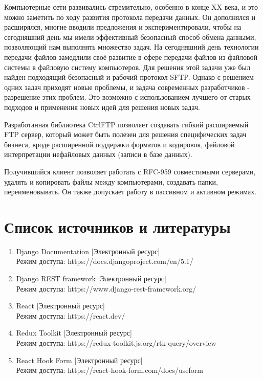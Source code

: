 \documentclass[a4paper,14pt]{extarticle}
\begin{document}
Компьютерные сети развивались стремительно, особенно в конце XX века, и это можно заметить по ходу
развития протокола передачи данных. Он дополнялся и расширялся, многие вводили предложения 
и экспериментировали, чтобы на сегодняшний день мы имели эффективный безопасный способ
обмена данными, позволяющий нам выполнять множество задач. На сегодняшний день 
технологии передачи файлов замедлили своё развитие в сфере
передачи файлов из файловой системы в файловую систему компьютеров. 
Для решения этой задачи уже был найден подходящий безопасный и рабочий протокол SFTP.
Однако с решением одних задач приходят новые проблемы, и задача современных разработчиков - 
разрешение этих проблем. Это возможно с использованием лучшего от старых подходов
и применения новых идей для решения новых задач.

Разработанная библиотека CtrlFTP позволяет создавать гибкий расширяемый FTP 
сервер, который может быть полезен для решения специфических задач бизнеса, 
вроде расширенной поддержки форматов и кодировок, файловой интерпретации 
нефайловых данных (записи в базе данных). 

Получившийся клиент позволяет работать с RFC-959 совместимыми серверами, удалять
и копировать файлы между компьютерами, создавать папки, переименовывать. Он также
допускает работу в пассивном и активном режимах.

\newpage

\section{Список источников и литературы}
\begin{enumerate}
    \item Django Documentation [Электронный ресурс] \\Режим доступа: https://docs.djangoproject.com/en/5.1/
    \item Django REST framework [Электронный ресурс] \\Режим доступа: https://www.django-rest-framework.org/
    \item React [Электронный ресурс] \\Режим доступа: https://react.dev/
    \item Redux Toolkit [Электронный ресурс] \\Режим доступа: https://redux-toolkit.js.org/rtk-query/overview
    \item React Hook Form [Электронный ресурс] \\Режим доступа: https://react-hook-form.com/docs/useform
\end{enumerate}
\end{document}

